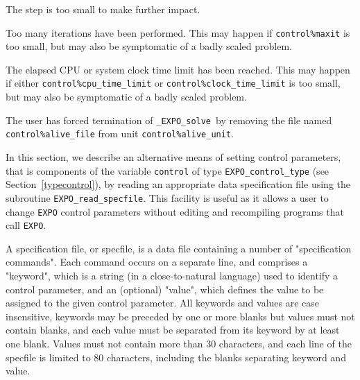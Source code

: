 \documentclass{galahad}
\newcommand{\packagename}{EXPO}
\newcommand{\fullpackagename}{\libraryname\_\packagename}
\newcommand{\solver}{{\tt \fullpackagename\_solve}}
\begin{document}
\begin{description}
 The step is too small to make further impact.

 Too many iterations have been performed.
  This may happen if
    {\tt control\%maxit} is too small, but may also be symptomatic of
    a badly scaled problem.

 The elapsed CPU or system clock time limit has been
    reached. This may happen if either {\tt control\%cpu\_time\_limit} or
    {\tt control\%clock\_time\_limit} is too small, but may also be symptomatic
    of a badly scaled problem.

 The user has forced termination of \solver\
     by removing the file named {\tt control\%a\-live\_file} from
     unit {\tt control\%alive\_unit}.

\end{description}


\galfeatures
\noindent In this section, we describe an alternative means of setting
control parameters, that is components of the variable {\tt control} of type
{\tt \packagename\_control\_type}
(see Section~\ref{typecontrol}),
by reading an appropriate data specification file using the
subroutine {\tt \packagename\_read\_specfile}. This facility
is useful as it allows a user to change  {\tt \packagename} control parameters
without editing and recompiling programs that call {\tt \packagename}.

A specification file, or specfile, is a data file containing a number of
"specification commands". Each command occurs on a separate line,
and comprises a "keyword",
which is a string (in a close-to-natural language) used to identify a
control parameter, and
an (optional) "value", which defines the value to be assigned to the given
control parameter. All keywords and values are case insensitive,
keywords may be preceded by one or more blanks but
values must not contain blanks, and
each value must be separated from its keyword by at least one blank.
Values must not contain more than 30 characters, and
each line of the specfile is limited to 80 characters,
including the blanks separating keyword and value.
\end{document}
